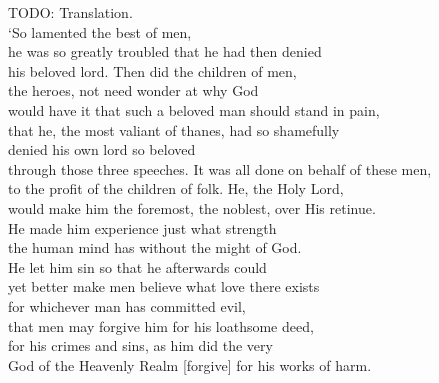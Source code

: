 \bvb TODO: Translation. \\
‘So lamented the best of men, \\
he was so greatly troubled that he had then denied \\
his beloved lord.  Then did the children of men, \\
the heroes, not need wonder at why God \\
would have it that such a beloved man should stand in pain, \\
that he, the most valiant of thanes, had so shamefully \\
denied his own lord so beloved \\
through those three speeches.  It was all done on behalf of these men, \\
to the profit of the children of folk.  He, the Holy Lord, \\
would make him the foremost, the noblest, over His retinue. \\
He made him experience just what strength \\
the human mind has without the might of God. \\
He let him sin so that he afterwards could \\
yet better make men believe what love there exists \\
for whichever man has committed evil, \\
that men may forgive him for his loathsome deed, \\
for his crimes and sins, as him did the very \\
God of the Heavenly Realm [forgive] for his works of harm.\evb\evg

